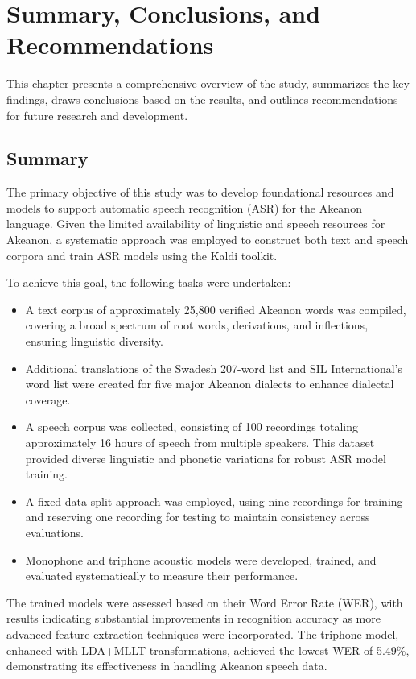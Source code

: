 \chapter{Summary, Conclusions, and Recommendations}

This chapter presents a comprehensive overview of the study, summarizes the key findings, draws conclusions based on the results, and outlines recommendations for future research and development.

\section{Summary}

The primary objective of this study was to develop foundational resources and models to support automatic speech recognition (ASR) for the Akeanon language. Given the limited availability of linguistic and speech resources for Akeanon, a systematic approach was employed to construct both text and speech corpora and train ASR models using the Kaldi toolkit.

To achieve this goal, the following tasks were undertaken:

\begin{itemize} \item A text corpus of approximately 25,800 verified Akeanon words was compiled, covering a broad spectrum of root words, derivations, and inflections, ensuring linguistic diversity. \item Additional translations of the Swadesh 207-word list and SIL International’s word list were created for five major Akeanon dialects to enhance dialectal coverage. \item A speech corpus was collected, consisting of 100 recordings totaling approximately 16 hours of speech from multiple speakers. This dataset provided diverse linguistic and phonetic variations for robust ASR model training. \item A fixed data split approach was employed, using nine recordings for training and reserving one recording for testing to maintain consistency across evaluations. \item Monophone and triphone acoustic models were developed, trained, and evaluated systematically to measure their performance. \end{itemize}

The trained models were assessed based on their Word Error Rate (WER), with results indicating substantial improvements in recognition accuracy as more advanced feature extraction techniques were incorporated. The triphone model, enhanced with LDA+MLLT transformations, achieved the lowest WER of 5.49\%, demonstrating its effectiveness in handling Akeanon speech data.

